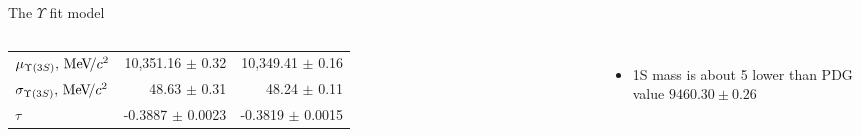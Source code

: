 \begin{frame}{The $\Upsilon$ fit model}
\begin{columns}
{\begin{tabular}{lrr}
\rule{0pt}{4ex}$\mu_{\Y3S}, \mevcc$ & 10,351.16 $\pm$ 0.32 & 10,349.41 $\pm$ 0.16\\
$\sigma_{\Y3S}, \mevcc$ & 48.63 $\pm$ 0.31 & 48.24 $\pm$ 0.11\\

$\tau$ & -0.3887 $\pm$ 0.0023 & -0.3819 $\pm$ 0.0015\\
\bottomrule
\end{tabular}
} %

\bigskip

\begin{itemize}
\item \Y1S mass is about 5 \mevcc lower than PDG value $9460.30 \pm  0.26$ \mevcc
\end{itemize}
\end{columns}


\end{frame}

